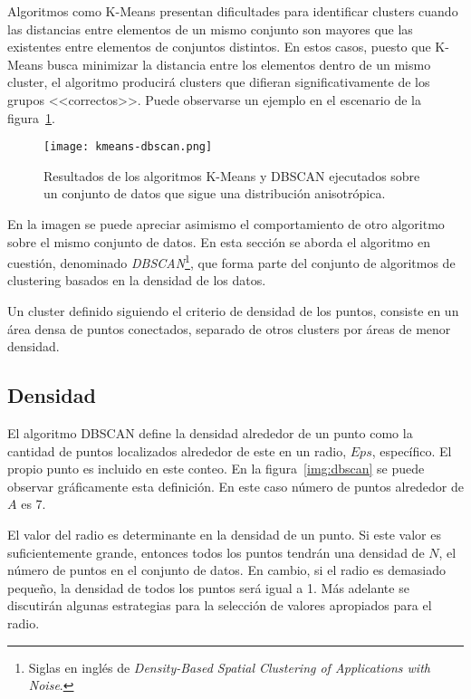 Algoritmos como K-Means presentan dificultades para identificar clusters cuando las distancias entre elementos de un mismo conjunto son mayores que las existentes entre elementos de conjuntos distintos.
En estos casos, puesto que K-Means busca minimizar la distancia entre los elementos dentro de un mismo cluster, el algoritmo producirá clusters que difieran significativamente de los grupos <<correctos>>.
Puede observarse un ejemplo en el escenario de la figura~\ref{img:kmeans-dbscan}.

\begin{figure}[!h]
    \centering
    \texttt{[image: kmeans-dbscan.png]}
    \caption{Resultados de los algoritmos K-Means y DBSCAN ejecutados sobre un conjunto de datos que sigue una distribución anisotrópica.}
    \label{img:kmeans-dbscan}
\end{figure}

En la imagen se puede apreciar asimismo el comportamiento de otro algoritmo sobre el mismo conjunto de datos.
En esta sección se aborda el algoritmo en cuestión, denominado \textit{DBSCAN}\footnote{Siglas en inglés de \textit{Density-Based Spatial Clustering of Applications with Noise}.}, que forma parte del conjunto de algoritmos de clustering basados en la densidad de los datos.

Un cluster definido siguiendo el criterio de densidad de los puntos, consiste en un área densa de puntos conectados, separado de otros clusters por áreas de menor densidad.

\subsection{Densidad}\label{subsec:densidad}

El algoritmo DBSCAN define la densidad alrededor de un punto como la cantidad de puntos localizados alrededor de este en un radio, $Eps$, específico.
El propio punto es incluido en este conteo.
En la figura~\ref{img:dbscan} se puede observar gráficamente esta definición.
En este caso número de puntos alrededor de $A$ es 7.

El valor del radio es determinante en la densidad de un punto.
Si este valor es suficientemente grande, entonces todos los puntos tendrán una densidad de $N$, el número de puntos en el conjunto de datos.
En cambio, si el radio es demasiado pequeño, la densidad de todos los puntos será igual a 1.
Más adelante se discutirán algunas estrategias para la selección de valores apropiados para el radio.

